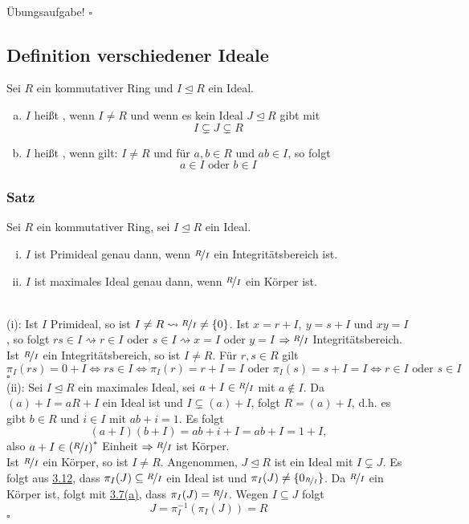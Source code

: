 \\
Übungsaufgabe!
\hfill $\square$

\subsection{Definition verschiedener Ideale}
\label{sub:def_vers_ideale}
Sei $R$ ein kommutativer Ring und $I\trianglelefteq R$ ein Ideal.
\begin{enumerate}[(a)]
	\item $I$ heißt , wenn $I\neq R$ und wenn es kein Ideal $J\trianglelefteq R$ gibt mit
	\[
	I\subsetneq J\subsetneq R
	\]
	\item $I$ heißt , wenn gilt:
	$I\neq R$ und für $a,b\in R$ und $ab\in I$, so folgt
	\[
	a\in I \text{ oder } b\in I
	\]
\end{enumerate}

\subsubsection*{Satz}
Sei $R$ ein kommutativer Ring, sei $I\trianglelefteq R$ ein Ideal.
\begin{enumerate}[(i)]
	\item $I$ ist Primideal genau dann, wenn $\nicefrac{R}{I}$ ein Integritätsbereich ist.
	\item $I$ ist maximales Ideal genau dann, wenn $\nicefrac{R}{I}$ ein Körper ist.
\end{enumerate}

\\
(i): Ist $I$ Primideal, so ist $I\neq R\rightsquigarrow \nicefrac{R}{I}\neq \{0\}$.
Ist $x=r+I,~y=s+I$ und $xy=I$, so folgt $rs\in I\rightsquigarrow r\in I$ oder $s\in I\rightsquigarrow x=I$ oder $y=I$ $\Rightarrow \nicefrac{R}{I}$ Integritätsbereich.\\
Ist $\nicefrac{R}{I}$ ein Integritätsbereich, so ist $I\neq R$.
Für $r,s\in R$ gilt 
\[
\pi_I(rs)=0+I\Leftrightarrow rs\in I \Leftrightarrow\pi_I(r)=r+I=I \text{ oder } \pi_I(s)=s+I=I \Leftrightarrow r\in I \text{ oder } s\in I
\]
\hfill $\square$\\

(ii): Sei $I\trianglelefteq R$ ein maximales Ideal, sei $a+I\in \nicefrac{R}{I}$ mit $a\notin I$.
Da $(a)+I=aR+I$ ein Ideal ist und $I\subsetneq (a)+I$, folgt $R=(a)+I$, d.h. es gibt $b\in R$ und $i\in I$ mit $ab+i=1$.
Es folgt 
\[
(a+I)(b+I)=ab+i+I=ab+I=1+I,
\]
also $a+I\in\left( \nicefrac{R}{I}\right)^*$ Einheit $\Rightarrow \nicefrac{R}{I}$ ist Körper.\\
Ist $\nicefrac{R}{I}$ ein Körper, so ist $I\neq R$.
Angenommen, $J\trianglelefteq R$ ist ein Ideal mit $I\subsetneq J$.
Es folgt aus \hyperref[sub:satz_13]{3.12}, dass $\pi_I(J)\subseteq \nicefrac{R}{I}$ ein Ideal ist und $\pi_I(J)\neq \{0_{\nicefrac{R}{I}}\}$.
Da $\nicefrac{R}{I}$ ein Körper ist, folgt mit \hyperref[sub:bsp_ideale]{3.7(a)}, dass $\pi_I(J)=\nicefrac{R}{I}$.
Wegen $I\subseteq J$ folgt
\[
J=\pi_I^{-1}(\pi_I(J))=R
\]
\hfill $\square$

